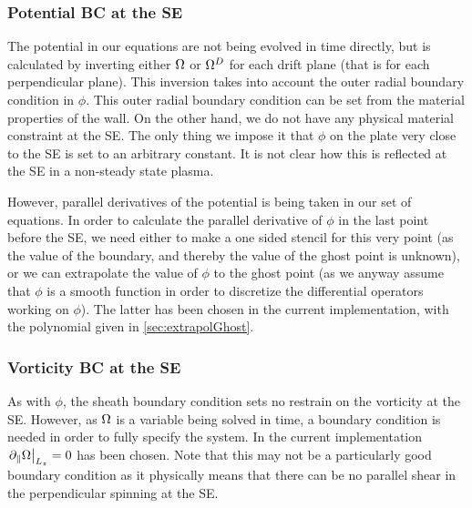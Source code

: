 \subsubsection{Potential BC at the SE}
%
The potential in our equations are not being evolved in time directly, but is calculated by inverting either $\Omega$ or $\Omega^D$ for each drift plane (that is for each perpendicular plane).
This inversion takes into account the outer radial boundary condition in $\phi$.
This outer radial boundary condition can be set from the material properties of the wall.
On the other hand, we do not have any physical material constraint at the SE.
The only thing we impose it that $\phi$ on the plate very close to the SE is set to an arbitrary constant.
 It is not clear how this is reflected at the SE in a non-steady state plasma.

However, parallel derivatives of the potential is being taken in our set of equations.
In order to calculate the parallel derivative of $\phi$ in the last point before the SE, we need either to make a one sided stencil for this very point (as the value of the boundary, and thereby the value of the ghost point is unknown), or we can extrapolate the value of $\phi$ to the ghost point (as we anyway assume that $\phi$ is a smooth function in order to discretize the differential operators working on $\phi$).
The latter has been chosen in the current implementation, with the polynomial given in \cref{sec:extrapolGhost}.

\subsubsection{Vorticity BC at the SE}
As with $\phi$, the sheath boundary condition sets no restrain on the vorticity at the SE.
However, as $\Omega$ is a variable being solved in time, a boundary condition is needed in order to fully specify the system.
In the current implementation $\left. \partial_\| \Omega \right|_{L_z} = 0$ has been chosen.
Note that this may not be a particularly good boundary condition as it physically means that there can be no parallel shear in the perpendicular spinning at the SE.

